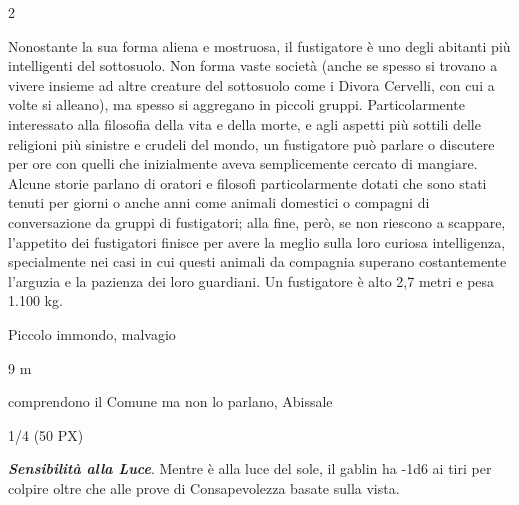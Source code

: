 \begin{multicols}{2}
{Nonostante la sua forma aliena e mostruosa, il fustigatore è uno degli abitanti più intelligenti del sottosuolo. Non forma vaste società (anche se spesso si trovano a vivere insieme ad altre creature del sottosuolo come i Divora Cervelli, con cui a volte si alleano), ma spesso si aggregano in piccoli gruppi. Particolarmente interessato alla filosofia della vita e della morte, e agli aspetti più sottili delle religioni più sinistre e crudeli del mondo, un fustigatore può parlare o discutere per ore con quelli che inizialmente aveva semplicemente cercato di mangiare. Alcune storie parlano di oratori e filosofi particolarmente dotati che sono stati tenuti per giorni o anche anni come animali domestici o compagni di conversazione da gruppi di fustigatori; alla fine, però, se non riescono a scappare, l'appetito dei fustigatori finisce per avere la meglio sulla loro curiosa intelligenza, specialmente nei casi in cui questi animali da compagnia superano costantemente l'arguzia e la pazienza dei loro guardiani.
Un fustigatore è alto 2,7 metri e pesa 1.100 kg.


\begin{description}[noitemsep, topsep=0pt, parsep=0pt, partopsep=0pt, itemsep=1pt, leftmargin=2.35cm,  labelwidth=2.2cm, itemindent=0cm, listparindent=0pt] %
\setlength{\baselineskip}{10pt}
\item[\textbf{Taglia/Tipo}] Piccolo immondo, malvagio
\item[\textbf{Caratt.}] 
\item[\textbf{Punti Ferita}] 
\item[\textbf{Movimento}] 9 m
\item[\textbf{Tiri Salvez.}] 
\item[\textbf{Sensi}] 
\item[\textbf{Linguaggi}] comprendono il Comune ma non lo parlano, Abissale
\item[\textbf{Sfida}] 1/4 (50 PX)
\end{description}
\smallskip

\emph{\textbf{Sensibilità alla Luce}}. Mentre è alla luce del sole, il gablin ha -1d6 ai tiri per colpire oltre che alle prove di Consapevolezza basate sulla vista.

}
\end{multicols}
